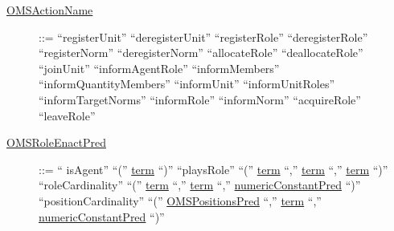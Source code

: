\begin{description}

\item[\underline{OMSActionName}] ::=  ``registerUnit''  \textbar ``deregisterUnit''  \textbar ``registerRole''  \textbar 
		``deregisterRole'' \textbar ``registerNorm'' \textbar ``deregisterNorm'' \textbar ``allocateRole''  \textbar
		``deallocateRole''  \textbar ``joinUnit'' \textbar ``informAgentRole''  \textbar ``informMembers'' \textbar
		``informQuantityMembers''  \textbar ``informUnit''  \textbar ``informUnitRoles''  \textbar 
		``informTargetNorms'' \textbar ``informRole''  \textbar ``informNorm''  \textbar ``acquireRole'' \textbar ``leaveRole'' 
                

\item[\underline{OMSRoleEnactPred}] ::= `` isAgent'' ``('' \underline{term} ``)'' \textbar 
		``playsRole'' ``('' \underline{term} ``,'' \underline{term} ``,'' \underline{term} ``)'' \textbar
		``roleCardinality'' ``('' \underline{term} ``,'' \underline{term} ``,'' \underline{numericConstantPred} ``)'' \textbar 
		``positionCardinality'' ``('' \underline{OMSPositionsPred} ``,'' \underline{term} ``,'' \underline{numericConstantPred} ``)'' 





\end{description}
